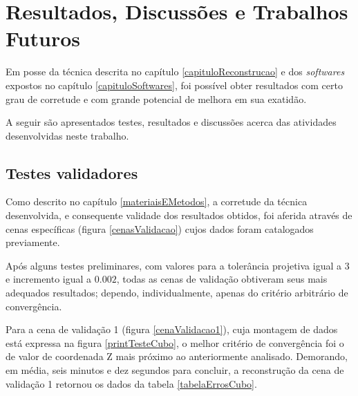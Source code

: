 \chapter{Resultados, Discussões e Trabalhos Futuros}
	\label{capituloFinal}
	
	Em posse da técnica descrita no capítulo \ref{capituloReconstrucao} e dos \textit{softwares} expostos no capítulo \ref{capituloSoftwares}, foi possível obter resultados com certo grau de corretude e com grande potencial de melhora em sua exatidão.
	
	A seguir são apresentados testes, resultados e discussões acerca das atividades desenvolvidas neste trabalho.
	
	\section{Testes validadores}
		\label{secaoTestes}
		
		Como descrito no capítulo \ref{materiaisEMetodos}, a corretude da técnica desenvolvida, e consequente validade dos resultados obtidos, foi aferida através de cenas específicas (figura \ref{cenasValidacao}) cujos dados foram catalogados previamente.
		
		Após alguns testes preliminares, com valores para a tolerância projetiva igual a $3$ e incremento igual a $0.002$, todas as cenas de validação obtiveram seus mais adequados resultados; dependo, individualmente, apenas do critério arbitrário de convergência.
		
		Para a cena de validação 1 (figura \ref{cenaValidacao1}), cuja montagem de dados está expressa na figura \ref{printTesteCubo}, o melhor critério de convergência foi o de valor de coordenada Z mais próximo ao anteriormente analisado. Demorando, em média, seis minutos e dez segundos para concluir, a reconstrução da cena de validação 1 retornou os dados da tabela \ref{tabelaErrosCubo}.
		
